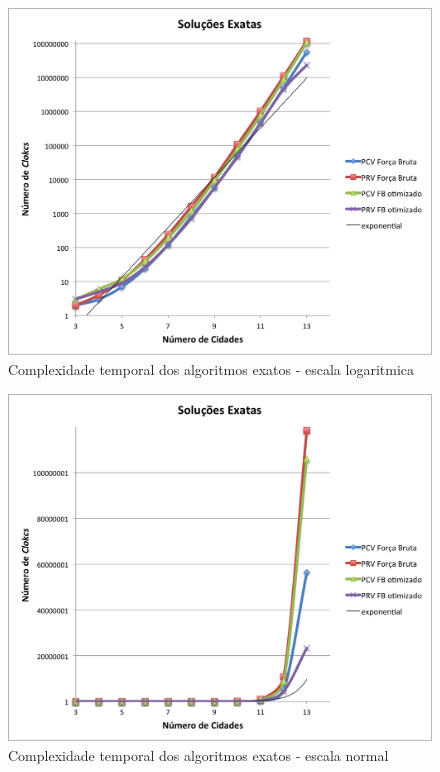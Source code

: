 \documentclass[12pt,a4paper,reqno]{report}
\numberwithin{equation}{section}
\begin{document}
\begin{figure} [ht]
\begin{center}
\includegraphics[width=15cm]{exact.png}
\caption{Complexidade temporal dos algoritmos exatos - escala logaritmica}
\label{exact}
\end{center}
\end{figure}

\begin{figure} [ht]
\begin{center}
\includegraphics[width=15cm]{exact2.png}
\caption{Complexidade temporal dos algoritmos exatos - escala normal}
\label{exact2}
\end{center}
\end{figure}
\end{document}
